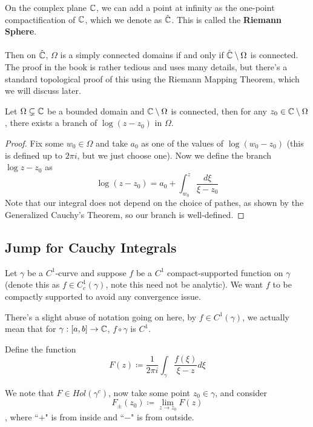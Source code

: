 \documentclass{article}
\begin{document}
\begin{remark}
    On the complex plane $\mathbb{C}$, we can add a point at infinity as the one-point compactification of $\mathbb{C}$, which we denote as $\hat{\mathbb{C}}$. This is called the \textbf{Riemann Sphere}.\\\\
    Then on $\hat{\mathbb{C}}$, $\Omega$ is a simply connected domains if and only if $\hat{\mathbb{C}} \setminus \Omega$ is connected. The proof in the book is rather tedious and uses many details, but there's a standard topological proof of this using the Riemann Mapping Theorem, which we will discuss later.
\end{remark}

\begin{corollary}
    Let $\Omega \subsetneq \mathbb{C}$ be a bounded domain and $\mathbb{C} \setminus \Omega$ is connected, then for any $z_0 \in \mathbb{C} \setminus \Omega$, there exists a branch of $\log(z - z_0)$ in $\Omega$.
\end{corollary}

\begin{proof}
    Fix some $w_0 \in \Omega$ and take $a_0$ as one of the values of $\log (w_0 - z_0)$ (this is defined up to $2\pi i$, but we just choose one). Now we define the branch $\log z - z_0$ as
    \[\log(z - z_0) = a_0 + \int_{w_0}^z \frac{d\xi}{\xi - z_0} \]
    Note that our integral does not depend on the choice of pathes, as shown by the Generalized Cauchy's Theorem, so our branch is well-defined.
\end{proof}

\subsection{Jump for Cauchy Integrals}

Let $\gamma$ be a $C^1$-curve and suppose $f$ be a $C^1$ compact-supported function on $\gamma$ (denote this as $f \in C^1_c(\gamma)$, note this need not be analytic). We want $f$ to be compactly supported to avoid any convergence issue.

There's a slight abuse of notation going on here, by $f \in C^1(\gamma)$, we actually mean that for $\gamma: [a, b] \to \mathbb{C}$, $f \circ \gamma$ is $C^1$.

Define the function
\[F(z) \coloneqq \frac{1}{2\pi i} \int_\gamma \frac{f(\xi)}{\xi - z} d\xi\]

We note that $F \in Hol(\gamma^c)$, now take some point $z_0 \in \gamma$, and consider
\[F_{\pm}(z_0) \coloneqq \lim_{z \to z_0} F(z)\]
, where ``$+$" is from inside and ``$-$" is from outside.\\\\
\end{document}
